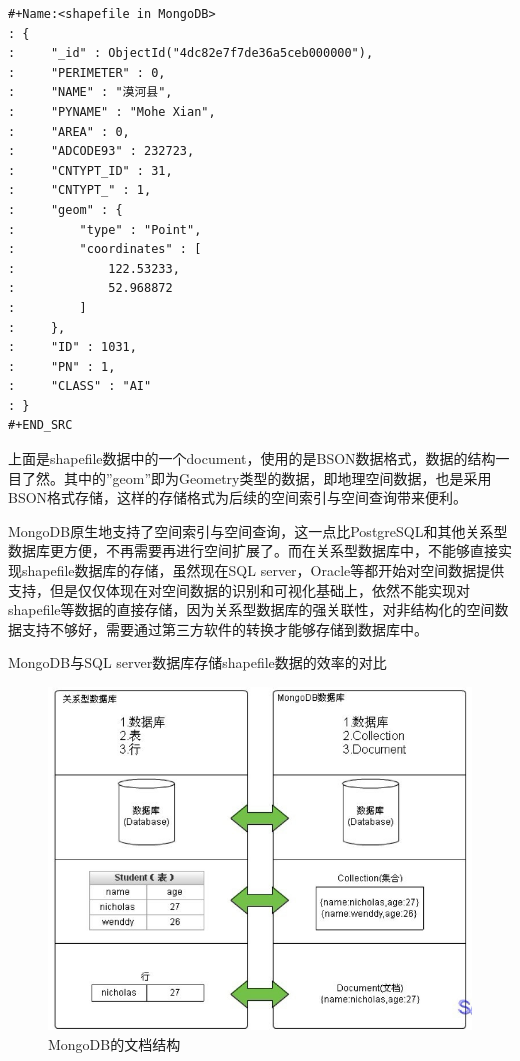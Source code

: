\documentclass[master]{njnuthesis}
\begin{document}
\begin{verbatim}
#+Name:<shapefile in MongoDB>
: {
:     "_id" : ObjectId("4dc82e7f7de36a5ceb000000"),
:     "PERIMETER" : 0,
:     "NAME" : "漠河县",
:     "PYNAME" : "Mohe Xian",
:     "AREA" : 0,
:     "ADCODE93" : 232723,
:     "CNTYPT_ID" : 31,
:     "CNTYPT_" : 1,
:     "geom" : {
:         "type" : "Point",
:         "coordinates" : [
:             122.53233,
:             52.968872
:         ]
:     },
:     "ID" : 1031,
:     "PN" : 1,
:     "CLASS" : "AI"
: }
#+END_SRC
\end{verbatim}

上面是shapefile数据中的一个document，使用的是BSON数据格式，数据的结构一目了然。其中的''geom''即为Geometry类型的数据，即地理空间数据，也是采用BSON格式存储，这样的存储格式为后续的空间索引与空间查询带来便利。

MongoDB原生地支持了空间索引与空间查询，这一点比PostgreSQL和其他关系型数据库更方便，不再需要再进行空间扩展了。而在关系型数据库中，不能够直接实现shapefile数据库的存储，虽然现在SQL server，Oracle等都开始对空间数据提供支持，但是仅仅体现在对空间数据的识别和可视化基础上，依然不能实现对shapefile等数据的直接存储，因为关系型数据库的强关联性，对非结构化的空间数据支持不够好，需要通过第三方软件的转换才能够存储到数据库中。

MongoDB与SQL server数据库存储shapefile数据的效率的对比
\begin{figure}[!htb]
\begin{center}
\includegraphics[angle=0,width=1\textwidth]{pic//mongoDB_fileType.jpg}
\caption{MongoDB的文档结构}
\label{fig:1}
\end{center}
\end{figure}
\end{document}
